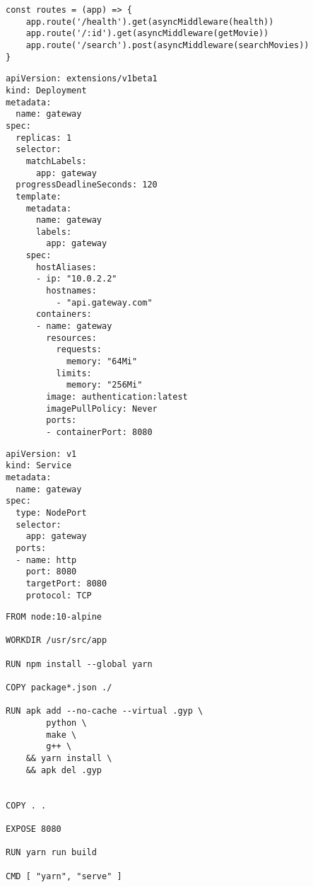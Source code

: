 \begin{lstlisting}[caption=Movie api routes, basicstyle=\tiny, label=movie_schema]
const routes = (app) => {
    app.route('/health').get(asyncMiddleware(health))
    app.route('/:id').get(asyncMiddleware(getMovie))
    app.route('/search').post(asyncMiddleware(searchMovies))
}
\end{lstlisting}

\begin{lstlisting}[caption=Kubernetes Deployment Yaml, basicstyle=\tiny, label=deployment]
apiVersion: extensions/v1beta1
kind: Deployment
metadata:
  name: gateway
spec:
  replicas: 1
  selector:
    matchLabels:
      app: gateway
  progressDeadlineSeconds: 120
  template:
    metadata:
      name: gateway
      labels:
        app: gateway
    spec:
      hostAliases:
      - ip: "10.0.2.2"
        hostnames:
          - "api.gateway.com"
      containers:
      - name: gateway
        resources:
          requests:
            memory: "64Mi"
          limits:
            memory: "256Mi"
        image: authentication:latest
        imagePullPolicy: Never
        ports:
        - containerPort: 8080
\end{lstlisting}

\begin{lstlisting}[caption=Kubernetes Service Yaml, basicstyle=\tiny, label=service]
apiVersion: v1
kind: Service
metadata:
  name: gateway
spec:
  type: NodePort
  selector:
    app: gateway
  ports:
  - name: http
    port: 8080
    targetPort: 8080
    protocol: TCP
\end{lstlisting}

\begin{lstlisting}[caption=DockerFile Example, basicstyle=\tiny, label=dockerFile]
FROM node:10-alpine

WORKDIR /usr/src/app

RUN npm install --global yarn

COPY package*.json ./

RUN apk add --no-cache --virtual .gyp \
        python \
        make \
        g++ \
    && yarn install \
    && apk del .gyp


COPY . .

EXPOSE 8080

RUN yarn run build

CMD [ "yarn", "serve" ]
\end{lstlisting}